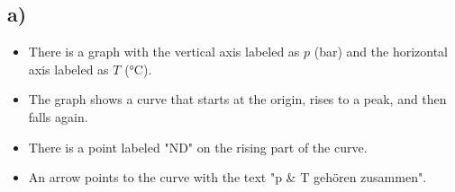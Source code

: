 

\subsection*{a)}

\begin{itemize}
    \item There is a graph with the vertical axis labeled as $p$ (bar) and the horizontal axis labeled as $T$ (°C).
    \item The graph shows a curve that starts at the origin, rises to a peak, and then falls again.
    \item There is a point labeled "ND" on the rising part of the curve.
    \item An arrow points to the curve with the text "p \& T gehören zusammen".
\end{itemize}
